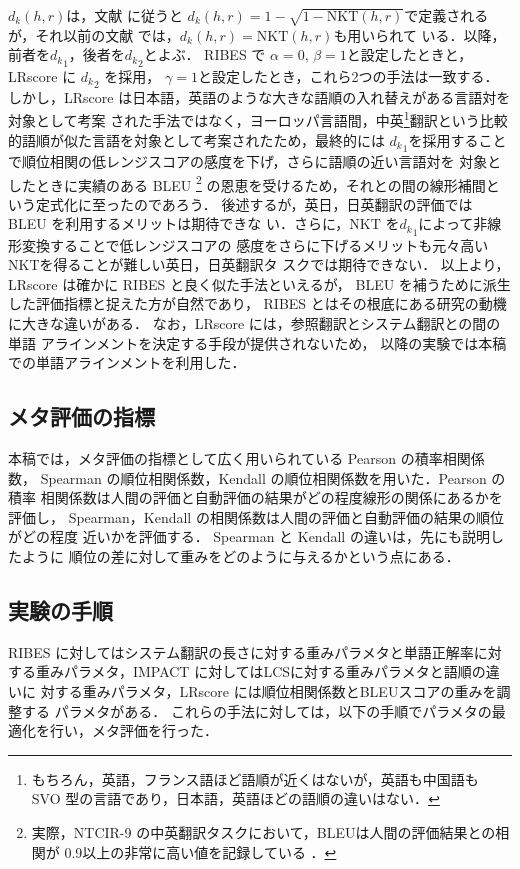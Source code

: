 \documentclass[japanese]{jnlp_1.4}
\begin{document}
$d_k(h,r)$は，文献\cite{birch-acl} に従うと
$d_k(h,r)=1-\sqrt{1-\mbox{NKT}(h,r)}$で定義されるが，それ以前の文献
\cite{birch,birch-wmt2010} では，$d_k(h,r)=\mbox{NKT}(h,r)$も用いられて
いる．以降，前者を${d_k}_1$，後者を${d_k}_2$とよぶ．
RIBES で $\alpha=0$, $\beta=1$と設定したときと，LRscore に ${d_k}_2$ を採用，
$\gamma=1$と設定したとき，これら2つの手法は一致する．しかし，LRscore
は日本語，英語のような大きな語順の入れ替えがある言語対を対象として考案
された手法ではなく，ヨーロッパ言語間，中英\footnote{
もちろん，英語，フランス語ほど語順が近くはないが，英語も中国語も SVO
型の言語であり，日本語，英語ほどの語順の違いはない．}翻訳という比較的語順が似た言語を対象として考案されたため，最終的には
${d_k}_1$を採用することで順位相関の低レンジスコアの感度を下げ，さらに語順の近い言語対を
対象としたときに実績のある BLEU \footnote{
実際，NTCIR-9 の中英翻訳タスクにおいて，BLEUは人間の評価結果との相関が
0.9以上の非常に高い値を記録している \cite{ntcir9}．} の恩恵を受けるため，それとの間の線形補間という定式化に至ったのであろう．
後述するが，英日，日英翻訳の評価では BLEU を利用するメリットは期待できな
い．さらに，NKT を${d_k}_1$によって非線形変換することで低レンジスコアの
感度をさらに下げるメリットも元々高いNKTを得ることが難しい英日，日英翻訳タ
スクでは期待できない．
以上より，LRscore は確かに RIBES と良く似た手法といえるが，
 BLEU を補うために派生した評価指標と捉えた方が自然であり， 
RIBES とはその根底にある研究の動機に大きな違いがある．
なお，LRscore には，参照翻訳とシステム翻訳との間の単語
アラインメントを決定する手段が提供されないため，
以降の実験では本稿での単語アラインメントを利用した．


\subsection{メタ評価の指標}

本稿では，メタ評価の指標として広く用いられている Pearson の積率相関係数，
Spearman の順位相関係数，Kendall の順位相関係数を用いた．Pearson の積率
相関係数は人間の評価と自動評価の結果がどの程度線形の関係にあるかを評価し，
Spearman，Kendall の相関係数は人間の評価と自動評価の結果の順位がどの程度
近いかを評価する．
Spearman と Kendall の違いは，先にも説明したように
順位の差に対して重みをどのように与えるかという点にある．


\subsection{実験の手順}

RIBES に対してはシステム翻訳の長さに対する重みパラメタと単語正解率に対
する重みパラメタ，IMPACT に対してはLCSに対する重みパラメタと語順の違いに
対する重みパラメタ，LRscore には順位相関係数とBLEUスコアの重みを調整する
パラメタがある．
これらの手法に対しては，以下の手順でパラメタの最適化を行い，メタ評価を行った．
\end{document}
